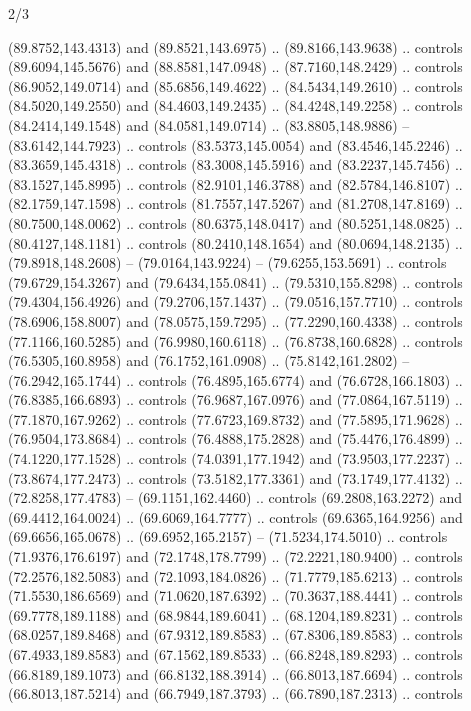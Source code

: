 \begin{flagdescription}{2/3}
\begin{scope}[shift={(0.5\flaglength,0.5)},scale=\flagwidth/320]
\begin{scope}[y=0.8pt, x=0.8pt, yscale=-1,shift={(-118.3,-146)}]
  (89.8752,143.4313) and (89.8521,143.6975) .. (89.8166,143.9638) .. controls
  (89.6094,145.5676) and (88.8581,147.0948) .. (87.7160,148.2429) .. controls
  (86.9052,149.0714) and (85.6856,149.4622) .. (84.5434,149.2610) .. controls
  (84.5020,149.2550) and (84.4603,149.2435) .. (84.4248,149.2258) .. controls
  (84.2414,149.1548) and (84.0581,149.0714) .. (83.8805,148.9886) --
  (83.6142,144.7923) .. controls (83.5373,145.0054) and (83.4546,145.2246) ..
  (83.3659,145.4318) .. controls (83.3008,145.5916) and (83.2237,145.7456) ..
  (83.1527,145.8995) .. controls (82.9101,146.3788) and (82.5784,146.8107) ..
  (82.1759,147.1598) .. controls (81.7557,147.5267) and (81.2708,147.8169) ..
  (80.7500,148.0062) .. controls (80.6375,148.0417) and (80.5251,148.0825) ..
  (80.4127,148.1181) .. controls (80.2410,148.1654) and (80.0694,148.2135) ..
  (79.8918,148.2608) -- (79.0164,143.9224) -- (79.6255,153.5691) .. controls
  (79.6729,154.3267) and (79.6434,155.0841) .. (79.5310,155.8298) .. controls
  (79.4304,156.4926) and (79.2706,157.1437) .. (79.0516,157.7710) .. controls
  (78.6906,158.8007) and (78.0575,159.7295) .. (77.2290,160.4338) .. controls
  (77.1166,160.5285) and (76.9980,160.6118) .. (76.8738,160.6828) .. controls
  (76.5305,160.8958) and (76.1752,161.0908) .. (75.8142,161.2802) --
  (76.2942,165.1744) .. controls (76.4895,165.6774) and (76.6728,166.1803) ..
  (76.8385,166.6893) .. controls (76.9687,167.0976) and (77.0864,167.5119) ..
  (77.1870,167.9262) .. controls (77.6723,169.8732) and (77.5895,171.9628) ..
  (76.9504,173.8684) .. controls (76.4888,175.2828) and (75.4476,176.4899) ..
  (74.1220,177.1528) .. controls (74.0391,177.1942) and (73.9503,177.2237) ..
  (73.8674,177.2473) .. controls (73.5182,177.3361) and (73.1749,177.4132) ..
  (72.8258,177.4783) -- (69.1151,162.4460) .. controls (69.2808,163.2272) and
  (69.4412,164.0024) .. (69.6069,164.7777) .. controls (69.6365,164.9256) and
  (69.6656,165.0678) .. (69.6952,165.2157) -- (71.5234,174.5010) .. controls
  (71.9376,176.6197) and (72.1748,178.7799) .. (72.2221,180.9400) .. controls
  (72.2576,182.5083) and (72.1093,184.0826) .. (71.7779,185.6213) .. controls
  (71.5530,186.6569) and (71.0620,187.6392) .. (70.3637,188.4441) .. controls
  (69.7778,189.1188) and (68.9844,189.6041) .. (68.1204,189.8231) .. controls
  (68.0257,189.8468) and (67.9312,189.8583) .. (67.8306,189.8583) .. controls
  (67.4933,189.8583) and (67.1562,189.8533) .. (66.8248,189.8293) .. controls
  (66.8189,189.1073) and (66.8132,188.3914) .. (66.8013,187.6694) .. controls
  (66.8013,187.5214) and (66.7949,187.3793) .. (66.7890,187.2313) .. controls

\end{scope}
\end{scope}
\end{flagdescription}
